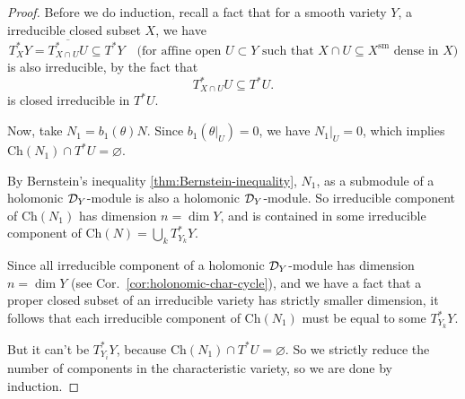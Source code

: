 \begin{proof}
    Before we do induction, recall a fact that for a smooth variety $Y$, a irreducible closed subset $X$, we have
    \[
        T^*_X Y = \overline{T^*_{X\cap U} U} \subseteq T^*Y \quad \text{(for affine open $U \subset Y$ such that $X\cap U \subseteq X^{\mathrm{sm}}$ dense in $X$)}
    \]
    is also irreducible, by the fact that
    \[
        T^*_{X \cap U} U \subseteq T^*U.
    \]
    is closed irreducible in $T^*U$.

    Now, take  $N_1 = b_1(\theta)N$.
    Since $b_1(\theta|_U) = 0$, we have $N_1|_U = 0$, which implies $\mathrm{Ch}(N_1) \cap T^*U = \varnothing$.

    By Bernstein's inequality \ref{thm:Bernstein-inequality},
    $N_1$, as a submodule of a holomonic $\mathcal{D}_Y$-module is also a holomonic $\mathcal{D}_Y$-module.
    So irreducible component of $\mathrm{Ch}(N_1)$ has dimension $n = \dim Y$,
    and is contained in some irreducible component of $\mathrm{Ch}(N) = \bigcup_k T^*_{Y_k} Y$.

    Since all irreducible component of a holomonic $\mathcal{D}_Y$-module has dimension $n = \dim Y$ (see Cor.~\ref{cor:holonomic-char-cycle}),
    and we have a fact that a proper closed subset of an irreducible variety has strictly smaller dimension,
    it follows that each irreducible component of $\mathrm{Ch}(N_1)$ must be equal to some $T^*_{Y_k} Y$.

    But it can't be $T^*_{Y_i} Y$, because $\mathrm{Ch}(N_1) \cap T^*U = \varnothing$.
    So we strictly reduce the number of components in the characteristic variety,
    so we are done by induction.


\end{proof}




